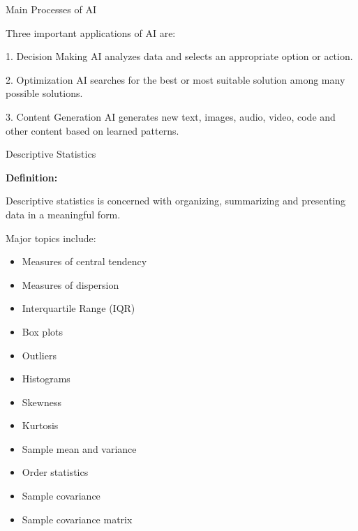 \documentclass[aspectratio=169]{beamer}
\begin{document}
\begin{frame}{Main Processes of AI}

Three important applications of AI are:

\begin{block}{1. Decision Making}
AI analyzes data and selects an appropriate option or action.
\end{block}

\begin{block}{2. Optimization}
AI searches for the best or most suitable solution among many
possible solutions.
\end{block}

\begin{block}{3. Content Generation}
AI generates new text, images, audio, video, code and other content
based on learned patterns.
\end{block}
\end{frame}

\begin{frame}{Descriptive Statistics}

\textbf{Definition:}

Descriptive statistics is concerned with organizing, summarizing and
presenting data in a meaningful form.

\vspace{0.4cm}

Major topics include:

\begin{itemize}
    \item Measures of central tendency
    \item Measures of dispersion
    \item Interquartile Range (IQR)
    \item Box plots
    \item Outliers
    \item Histograms
    \item Skewness
    \item Kurtosis
    \item Sample mean and variance
    \item Order statistics
    \item Sample covariance
    \item Sample covariance matrix
\end{itemize}
\end{frame}
\end{document}
